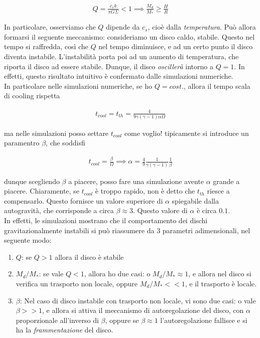 \documentclass{report}
\begin{document}
\begin{align}
    Q = \frac{c_s k}{\pi G \Sigma } < 1 \implies \frac{M_d}{M_*} \geq \frac{H}{R}
\end{align}

In particolare, osserviamo che \(Q\) dipende da \(c_s\), cioè dalla \emph{temperatura}. Può allora formarsi il seguente meccanismo: consideriamo un disco caldo, stabile. Questo nel tempo si raffredda, così che \(Q\) nel tempo diminuisce, e ad un certo punto il disco diventa instabile. L'instabilità porta poi ad un aumento di temperatura, che riporta il disco ad essere stabile. Dunque, il disco \emph{oscillerà} intorno a \(Q = 1\). In effetti, questo risultato intuitivo è confermato dalle simulazioni numeriche. \\

In particolare nelle simulazioni numeriche, se ho \(Q = cost.\), allora il tempo scala di cooling rispetta 

\begin{align}
    t_{cool} = t_{th} = \frac{4}{9\gamma(\gamma -1)\alpha \Omega}
\end{align}

ma nelle simulazioni posso settare \(t_{cool}\) come voglio! tipicamente si introduce un paramentro \(\beta\), che soddisfi

\begin{align}
    t_{cool} = \frac{\beta}{\Omega} \implies \alpha = \frac{4}{9}\frac{1}{\gamma(\gamma -1)}\frac{1}{\beta}
\end{align}

dunque scegliendo \(\beta\) a piacere, posso fare una simulazione avente \(\alpha\) grande a piacere. Chiaramente, se \(t_{cool}\) è troppo rapido, non è detto che \(t_{th}\) riesce a compensarlo. Questo fornisce un valore superiore di \(\alpha\) spiegabile dalla autogravità, che corrisponde a circa \(\beta \approx 3\). Questo valore di \(\alpha\) è circa \(0.1\). \\

In effetti, le simulazioni mostrano che il comportamento dei dischi gravitazionalmente instabili si può riassumere da 3 parametri adimensionali, nel seguente modo: 

\begin{enumerate}
    \item \(Q\): se \(Q>1\) allora il disco è stabile
    \item \(M_d/M_*\): se vale \(Q <1\), allora ho due casi: o \(M_d/M_* \approx 1\), e allora nel disco si verifica un trasporto non locale, oppure \(M_d/M_* <<1\), e il trasporto è locale. 
    \item \(\beta\): Nel caso di disco instabile con trasporto non locale, vi sono due casi: o vale \(\beta >> 1\), e allora si attiva il meccanismo di autoregolazione del disco, con \(\alpha\) proporzionale all'inverso di \(\beta\), oppure se \(\beta \approx 1\) l'autoregolazione fallisce e si ha la \emph{frammentazione} del disco. 
\end{enumerate}
\end{document}

